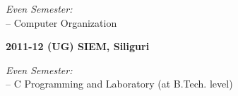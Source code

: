 \documentclass[11pt,a4paper]{moderncv}
\begin{document}
\begin{adjustwidth}{6em}{0pt}
\begin{adjustwidth}{2em}{0pt}
		\textit{Even Semester:} \\
		\hspace*{1.5em}-- Computer Organization \\
	\end{adjustwidth}
	
	\textbf{2011-12 (UG) SIEM, Siliguri}
	
	\begin{adjustwidth}{2em}{0pt}
		\textit{Even Semester:} \\
		\hspace*{1.5em}-- C Programming and Laboratory (at B.Tech. level) \\
	\end{adjustwidth}
	
\end{adjustwidth}
\end{document}
